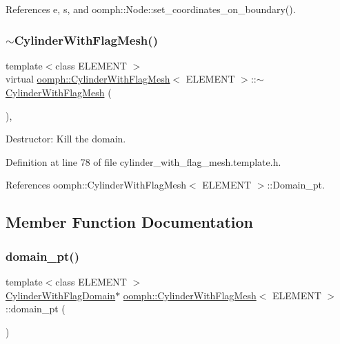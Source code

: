 References e, s, and oomph\+::\+Node\+::set\+\_\+coordinates\+\_\+on\+\_\+boundary().

\mbox{\label{classoomph_1_1CylinderWithFlagMesh_a04fb9a6ea7a70eb8dbfb83ef73ed7b48}} 
\subsubsection{\texorpdfstring{$\sim$\+Cylinder\+With\+Flag\+Mesh()}{~CylinderWithFlagMesh()}}
{\footnotesize\ttfamily template$<$class E\+L\+E\+M\+E\+NT $>$ \\
virtual \hyperlink{classoomph_1_1CylinderWithFlagMesh}{oomph\+::\+Cylinder\+With\+Flag\+Mesh}$<$ E\+L\+E\+M\+E\+NT $>$\+::$\sim$\hyperlink{classoomph_1_1CylinderWithFlagMesh}{Cylinder\+With\+Flag\+Mesh} (\begin{DoxyParamCaption}{ }\end{DoxyParamCaption})\hspace{0.3cm}{\ttfamily [inline]}, {\ttfamily [virtual]}}



Destructor\+: Kill the domain. 



Definition at line 78 of file cylinder\+\_\+with\+\_\+flag\+\_\+mesh.\+template.\+h.



References oomph\+::\+Cylinder\+With\+Flag\+Mesh$<$ E\+L\+E\+M\+E\+N\+T $>$\+::\+Domain\+\_\+pt.



\subsection{Member Function Documentation}
\mbox{\label{classoomph_1_1CylinderWithFlagMesh_abfaa03615a4a6f99ddc9100f739cb94f}} 
\subsubsection{\texorpdfstring{domain\+\_\+pt()}{domain\_pt()}}
{\footnotesize\ttfamily template$<$class E\+L\+E\+M\+E\+NT $>$ \\
\hyperlink{classoomph_1_1CylinderWithFlagDomain}{Cylinder\+With\+Flag\+Domain}$\ast$ \hyperlink{classoomph_1_1CylinderWithFlagMesh}{oomph\+::\+Cylinder\+With\+Flag\+Mesh}$<$ E\+L\+E\+M\+E\+NT $>$\+::domain\+\_\+pt (\begin{DoxyParamCaption}{ }\end{DoxyParamCaption})\hspace{0.3cm}{\ttfamily [inline]}}



